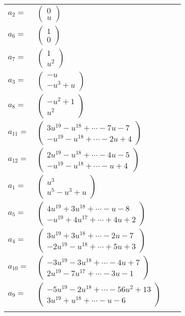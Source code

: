 \documentclass[1p]{elsarticle_modified}
\theoremstyle{definition}
\begin{document}
\begin{tabular}{m{7pt} m{180pt} m{7pt} m{180pt} }
\flushright $a_{2}=$&$\begin{pmatrix}0\\u\end{pmatrix}$ \\
\flushright $a_{6}=$&$\begin{pmatrix}1\\0\end{pmatrix}$ \\
\flushright $a_{7}=$&$\begin{pmatrix}1\\u^2\end{pmatrix}$ \\
\flushright $a_{3}=$&$\begin{pmatrix}- u\\- u^3+u\end{pmatrix}$ \\
\flushright $a_{8}=$&$\begin{pmatrix}- u^2+1\\u^2\end{pmatrix}$ \\
\flushright $a_{11}=$&$\begin{pmatrix}3 u^{19}- u^{18}+\cdots-7 u-7\\- u^{19}- u^{18}+\cdots-2 u+4\end{pmatrix}$ \\
\flushright $a_{12}=$&$\begin{pmatrix}2 u^{19}- u^{18}+\cdots-4 u-5\\- u^{19}- u^{18}+\cdots- u+4\end{pmatrix}$ \\
\flushright $a_{1}=$&$\begin{pmatrix}u^3\\u^5- u^3+u\end{pmatrix}$ \\
\flushright $a_{5}=$&$\begin{pmatrix}4 u^{19}+3 u^{18}+\cdots- u-8\\- u^{19}+4 u^{17}+\cdots+4 u+2\end{pmatrix}$ \\
\flushright $a_{4}=$&$\begin{pmatrix}3 u^{19}+3 u^{18}+\cdots-2 u-7\\-2 u^{19}- u^{18}+\cdots+5 u+3\end{pmatrix}$ \\
\flushright $a_{10}=$&$\begin{pmatrix}-3 u^{19}-3 u^{18}+\cdots-4 u+7\\2 u^{19}-7 u^{17}+\cdots-3 u-1\end{pmatrix}$ \\
\flushright $a_{9}=$&$\begin{pmatrix}-5 u^{19}-2 u^{18}+\cdots-56 u^2+13\\3 u^{19}+u^{18}+\cdots- u-6\end{pmatrix}$\\&\end{tabular}
\end{document}
